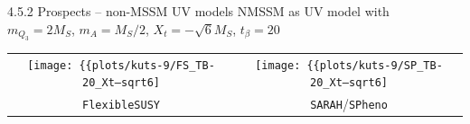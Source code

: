 \documentclass[hyperref={pdfpagelabels=false},ngerman]{beamer}
\newcommand{\eh}[1]{\,\mathsf{#1}}
\newcommand{\GeV}{\eh{GeV}}
\newcommand{\TeV}{\eh{TeV}}
\newcommand{\MS}{\ensuremath{M_S}}
\newcommand{\fs}{\texttt{FlexibleSUSY}\xspace}
\newcommand{\FH}{\texttt{FeynHiggs}\xspace}
\newcommand{\SPheno}{\texttt{SPheno}\xspace}
\newcommand{\SARAH}{\texttt{SARAH}\xspace}
\begin{document}
\begin{frame}{4.5.1 Prospects -- non-SM EFTs}
  Effective 2HDM in \FH with\\
  $\MS = 100\TeV$, $M_i = 500\GeV$, $X_t = 1.8\MS$, $t_\beta = 2$
  \begin{center}
    \texttt{[image: \{\{plots/kuts-9/FH]}}}
  \end{center}
\end{frame}

\begin{frame}{4.5.2 Prospects -- non-MSSM UV models}
  NMSSM as UV model with\\
  $m_{Q_3} = 2\MS$, $m_A = \MS/2$, $X_t = -\sqrt{6}\MS$, $t_\beta = 20$
  \begin{center}
    \begin{tabular}{cc}
      \texttt{[image: \{\{plots/kuts-9/FS\_TB-20\_Xt--sqrt6]}}} &
      \texttt{[image: \{\{plots/kuts-9/SP\_TB-20\_Xt--sqrt6]}}} \\
      \fs & \SARAH/\SPheno
    \end{tabular}
  \end{center}
\end{frame}
\end{document}
